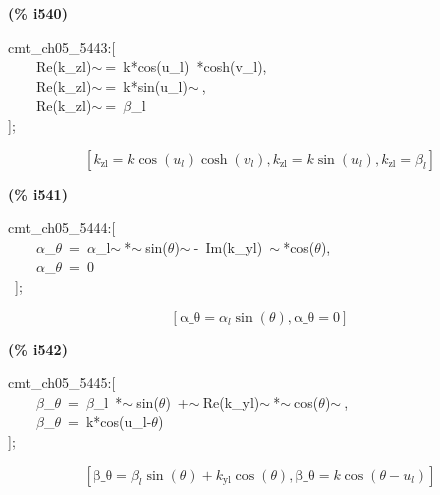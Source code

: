 \documentclass[fleqn]{article}
\begin{document}
\noindent
\begin{minipage}[t]{4.000000em}\color{red}\bfseries
(\% i540)	
\end{minipage}
\begin{minipage}[t]{\textwidth}\color{blue}
cmt\_ch05\_5443:[\\
\ \ \ \ Re(k\_zl)\ensuremath{\sim\ }=\ k*cos(u\_l)\ *cosh(v\_l),\\
\ \ \ \ Re(k\_zl)\ensuremath{\sim\ }=\ k*sin(u\_l)\ensuremath{\sim\ },\\
\ \ \ \ Re(k\_zl)\ensuremath{\sim\ }=\ \ensuremath{\beta}\_l\\
];
\end{minipage}
\[\displaystyle \tag{\% o540} 
\left[ {k_{\ensuremath{\mathrm{zl}}}}=k \cos{\left( {u_l}\right) } \cosh{\left( {v_l}\right) }\operatorname{,}{k_{\ensuremath{\mathrm{zl}}}}=k \sin{\left( {u_l}\right) }\operatorname{,}{k_{\ensuremath{\mathrm{zl}}}}={{\beta }_l}\right] \mbox{}
\]


\noindent
\begin{minipage}[t]{4.000000em}\color{red}\bfseries
(\% i541)	
\end{minipage}
\begin{minipage}[t]{\textwidth}\color{blue}
cmt\_ch05\_5444:[\\
\ \ \ \ \ensuremath{\alpha}\_\ensuremath{\theta}\ =\ \ensuremath{\alpha}\_l\ensuremath{\sim\ }*\ensuremath{\sim\ }sin(\ensuremath{\theta})\ensuremath{\sim\ }-\ Im(k\_yl)\ \ensuremath{\sim\ }*cos(\ensuremath{\theta}),\\
\ \ \ \ \ensuremath{\alpha}\_\ensuremath{\theta}\ =\ 0\\
\ ];
\end{minipage}
\[\displaystyle \tag{\% o541} 
\left[ \ensuremath{\mathrm{\alpha \_ \theta }}={{\alpha }_l} \sin{\left( \theta \right) }\operatorname{,}\ensuremath{\mathrm{\alpha \_ \theta }}=0\right] \mbox{}
\]


\noindent
\begin{minipage}[t]{4.000000em}\color{red}\bfseries
(\% i542)	
\end{minipage}
\begin{minipage}[t]{\textwidth}\color{blue}
cmt\_ch05\_5445:[\\
\ \ \ \ \ensuremath{\beta}\_\ensuremath{\theta}\ =\ \ensuremath{\beta}\_l\ *\ensuremath{\sim\ }sin(\ensuremath{\theta})\ +\ensuremath{\sim\ }Re(k\_yl)\ensuremath{\sim\ }*\ensuremath{\sim\ }cos(\ensuremath{\theta})\ensuremath{\sim\ },\\
\ \ \ \ \ensuremath{\beta}\_\ensuremath{\theta}\ =\ k*cos(u\_l-\ensuremath{\theta})\\
];
\end{minipage}
\[\displaystyle \tag{\% o542} 
\left[ \ensuremath{\mathrm{\beta \_ \theta }}={{\beta }_l} \sin{\left( \theta \right) }+{k_{\ensuremath{\mathrm{yl}}}} \cos{\left( \theta \right) }\operatorname{,}\ensuremath{\mathrm{\beta \_ \theta }}=k \cos{\left( \theta -{u_l}\right) }\right] \mbox{}
\]
\end{document}
